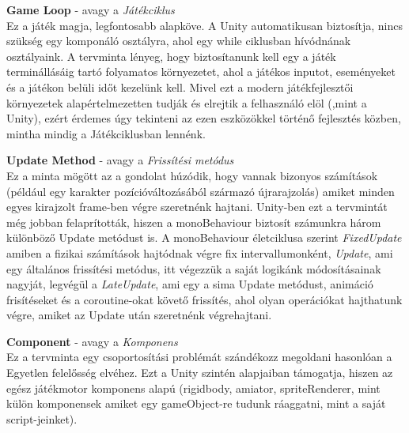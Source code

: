 \textbf{Game Loop} - avagy a \textit{Játékciklus}\\
Ez a játék magja, legfontosabb alapköve. A Unity automatikusan biztosítja, nincs szükség egy komponáló osztályra, ahol egy while ciklusban hívódnának osztályaink. A tervminta lényeg, hogy biztosítanunk kell egy a játék terminállásáig tartó folyamatos környezetet, ahol a játékos inputot, eseményeket és a játékon belüli időt kezelünk kell. Mivel ezt a modern játékfejlesztői környezetek alapértelmezetten tudják és elrejtik a felhasználó elöl (,mint a Unity), ezért érdemes úgy tekinteni az ezen eszközökkel történő fejlesztés közben, mintha mindig a Játékciklusban lennénk.

\textbf{Update Method} - avagy a \textit{Frissítési metódus}\\
Ez a minta mögött az a gondolat húzódik, hogy vannak bizonyos számítások (például egy karakter pozícióváltozásából származó újrarajzolás) amiket minden egyes kirajzolt frame-ben végre szeretnénk hajtani. Unity-ben ezt a tervmintát még jobban felaprították, hiszen a monoBehaviour biztosít számunkra három különböző Update metódust is. A monoBehaviour életciklusa szerint \textit{FixedUpdate} amiben a fizikai számítások hajtódnak végre fix intervallumonként, \textit{Update}, ami egy általános frissítési metódus, itt végezzük a saját logikánk módosításainak nagyját, legvégül a \textit{LateUpdate}, ami egy a sima Update metódust, animáció frisítéseket és a coroutine-okat követő frissítés, ahol olyan operációkat hajthatunk végre, amiket az Update után szeretnénk végrehajtani.

\textbf{Component} - avagy a \textit{Komponens}\\
Ez a tervminta egy csoportosítási problémát szándékozz megoldani hasonlóan a Egyetlen felelősség elvéhez. Ezt a Unity szintén alapjaiban támogatja, hiszen az egész játékmotor komponens alapú (rigidbody, amiator, spriteRenderer, mint külön komponensek amiket egy gameObject-re tudunk ráaggatni, mint a saját script-jeinket).

